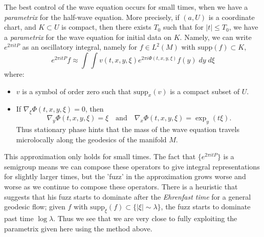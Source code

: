 \documentclass{article}
\theoremstyle{plain}
\theoremstyle{remark}
\theoremstyle{definition}
\begin{document}
The best control of the wave equation occurs for small times, when we have a \emph{parametrix} for the half-wave equation. More precisely, if $(a,U)$ is a coordinate chart, and $K \subset U$ is compact, then there exists $T_0$ such that for $|t| \leq T_0$, we have a \emph{parametrix} for the wave equation for initial data on $K$. Namely, we can write $e^{2 \pi i t P}$ as an oscillatory integral, namely for $f \in L^2(M)$ with $\text{supp}(f) \subset K$,
%
\[ e^{2 \pi i t P} f \approx \int \int v(t,x,y,\xi) e^{2 \pi i \Phi(t,x,y,\xi)} f(y)\; dy\; d\xi \]
%
where:
%
\begin{itemize}
    \item $v$ is a symbol of order zero such that $\text{supp}_x(v)$ is a compact subset of $U$.
    \item If $\nabla_\xi \Phi(t,x,y,\xi) = 0$, then
    \[ \nabla_y \Phi(t,x,y,\xi) = \xi \quad\text{and}\quad \nabla_x \Phi(t,x,y,\xi) = \exp_y( t \xi). \]
    Thus stationary phase hints that the mass of the wave equation travels microlocally along the geodesics of the manifold $M$.
\end{itemize}
%
This approximation only holds for small times. The fact that $\{ e^{2 \pi i t P} \}$ is a semigroup means we can compose these operators to give integral representations for slightly larger times, but the 'fuzz' in the approximation grows worse and worse as we continue to compose these operators. There is a heuristic that suggests that his fuzz starts to dominate after the \emph{Ehrenfast time} for a general geodesic flow; given $f$ with $\text{supp}_\xi(f) \subset \{ |\xi| \sim \lambda \}$, the fuzz starts to dominate past time $\log \lambda$. Thus we see that we are very close to fully exploiting the parametrix given here using the method above.
\end{document}
